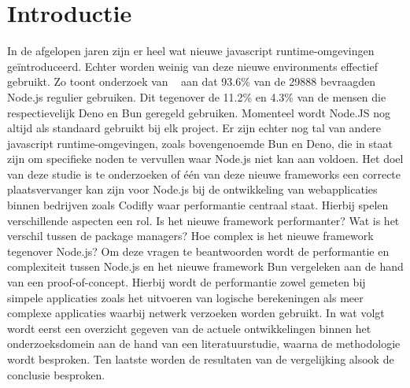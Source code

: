 
\section{Introductie}%
\label{sec:introductie}
In de afgelopen jaren zijn er heel wat nieuwe javascript runtime-omgevingen geïntroduceerd. 
Echter worden weinig van deze nieuwe environments effectief gebruikt. 
Zo toont onderzoek van ~\textcite{Greif2022} aan dat 93.6\% van de 29888 bevraagden Node.js regulier gebruiken.
Dit tegenover de 11.2\% en 4.3\% van de mensen die respectievelijk Deno en Bun geregeld gebruiken.
Momenteel wordt Node.JS nog altijd als standaard gebruikt bij elk project. 
Er zijn echter nog tal van andere javascript runtime-omgevingen, zoals bovengenoemde Bun en Deno, 
die in staat zijn om specifieke noden te vervullen waar Node.js niet kan aan voldoen.
Het doel van deze studie is te onderzoeken of één van deze nieuwe frameworks een correcte plaatsvervanger kan zijn voor Node.js
bij de ontwikkeling van webapplicaties binnen bedrijven zoals Codifly waar performantie centraal staat. Hierbij spelen verschillende aspecten een rol.
Is het nieuwe framework performanter? Wat is het verschil tussen de package managers?
Hoe complex is het nieuwe framework tegenover Node.js?
Om deze vragen te beantwoorden wordt de 
performantie en complexiteit tussen Node.js en het nieuwe framework Bun vergeleken aan de hand van een proof-of-concept.
Hierbij wordt de performantie zowel gemeten bij simpele applicaties zoals het uitvoeren van logische berekeningen
als meer complexe applicaties waarbij netwerk verzoeken worden gebruikt.
In wat volgt wordt eerst een overzicht gegeven van de actuele ontwikkelingen binnen het
onderzoeksdomein aan de hand van een literatuurstudie, waarna de methodologie wordt besproken.
Ten laatste worden de resultaten van de vergelijking alsook de conclusie besproken.



